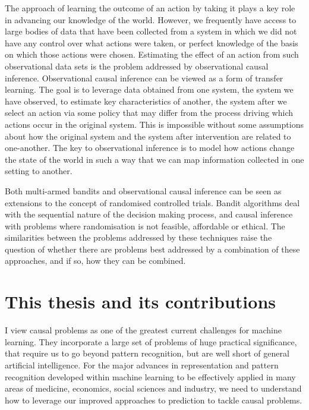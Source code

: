 \documentclass[11pt,a4paper,twoside]{report}
\theoremstyle{plain}
\theoremstyle{definition}
\begin{document}
The approach of learning the outcome of an action by taking it plays a key role in advancing our knowledge of the world. However, we frequently have access to large bodies of data that have been collected from a system in which we did not have any control over what actions were taken, or perfect knowledge of the basis on which those actions were chosen. Estimating the effect of an action from such observational data sets is the problem addressed by observational causal inference. Observational causal inference can be viewed as a form of transfer learning. The goal is to leverage data obtained from one system, the system we have observed, to estimate key characteristics of another, the system after we select an action via some policy that may differ from the process driving which actions occur in the original system. This is impossible without some assumptions about how the original system and the system after intervention are related to one-another. The key to observational inference is to model how actions change the state of the world in such a way that we can map information collected in one setting to another. 

Both multi-armed bandits and observational causal inference can be seen as extensions to the concept of randomised controlled trials. Bandit algorithms deal with the sequential nature of the decision making process, and causal inference with problems where randomisation is not feasible, affordable or ethical. The similarities between the problems addressed by these techniques raise the question of whether there are problems best addressed by a combination of these approaches, and if so, how they can be combined. 

\section{This thesis and its contributions}

I view causal problems as one of the greatest current challenges for machine learning. They incorporate a large set of problems of huge practical significance, that require us to go beyond pattern recognition, but are well short of general artificial intelligence. For the major advances in representation and pattern recognition developed within machine learning to be effectively applied in many areas of medicine, economics, social sciences and industry, we need to understand how to leverage our improved approaches to prediction to tackle causal problems. 
\end{document}
